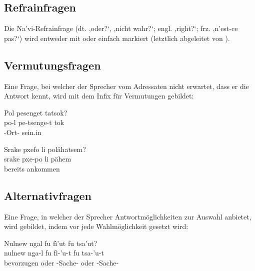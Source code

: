 \subsection{Refrainfragen} Die Na'vi-Refrainfrage (dt. ,oder?‘, ,nicht wahr?‘; engl. ,right?‘; frz. ,n'est-ce pas?‘) wird entweder mit  oder einfach  markiert (letztlich abgeleitet von  ).

\subsection{Vermutungsfragen} Eine Frage, bei welcher der Sprecher vom Adressaten nicht erwartet, dass er die Antwort kennt, wird mit dem Infix für Vermutungen  gebildet:

\begin{interlin}
	\glll \Npawl{}Pol pesenget tatsok? \\
	po-l pe-tsenge-t tok \\
	 -Ort- sein.in \\
\end{interlin}

\begin{interlin}
	\glll \Npawl{}Srake pxefo li polähatsem? \\
	srake pxe-po li pähem \\
	  bereits ankommen \\
\end{interlin}

\subsection{Alternativfragen} Eine Frage, in welcher der Sprecher Antwortmöglichkeiten zur Auswahl anbietet, wird gebildet, indem  vor jede Wahlmöglichkeit gesetzt wird:

\begin{interlin}
	\glll \Npawl{}Nulnew ngal fu fì'ut fu tsa'ut? \\
	nulnew nga-l fu fì-'u-t fu tsa-'u-t \\
	bevorzugen  oder -Sache- oder -Sache- \\
\end{interlin}


